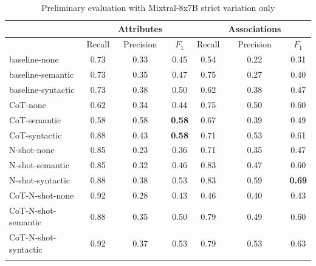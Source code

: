 \begin{table}[!h]
    \scriptsize
    \centering
    \setlength{\tabcolsep}{0.5em}
    \begin{tabular}{lcccccc}
    \toprule
         & & Attributes & & & Associations & \\
     \toprule
         & Recall & Precision & $F_1$ & Recall & Precision & $F_1$ \\
    \toprule
    
    \addlinespace
         baseline-none        & 0.73 & 0.33 & 0.45 & 0.54 & 0.22 & 0.31 \\
    	 baseline-semantic    & 0.73 & 0.35 & 0.47 & 0.75 & 0.27 & 0.40 \\
         baseline-syntactic   & 0.73 & 0.38 & 0.50 & 0.62 & 0.38 & 0.47 \\
         CoT-none             & 0.62 & 0.34 & 0.44 & 0.75 & 0.50 & 0.60 \\
         CoT-semantic         & 0.58 & 0.58 & \textbf{0.58} & 0.67 & 0.39 & 0.49 \\
         CoT-syntactic        & 0.88 & 0.43 & \textbf{0.58} & 0.71 & 0.53 & 0.61 \\
         N-shot-none          & 0.85 & 0.23 & 0.36 & 0.71 & 0.35 & 0.47 \\
         N-shot-semantic      & 0.85 & 0.32 & 0.46 & 0.83 & 0.47 & 0.60 \\
         N-shot-syntactic     & 0.88 & 0.38 & 0.53 & 0.83 & 0.59 & \textbf{0.69} \\
         CoT-N-shot-none      & 0.92 & 0.28 & 0.43 & 0.46 & 0.40 & 0.43 \\
         CoT-N-shot-semantic  & 0.88 & 0.35 & 0.50 & 0.79 & 0.49 & 0.60 \\
         CoT-N-shot-syntactic & 0.92 & 0.37 & 0.53 & 0.79 & 0.53 & 0.63 \\
    \addlinespace
    \bottomrule
    \addlinespace
    \end{tabular}
    \caption{Preliminary evaluation with Mixtral-8x7B strict variation only}
    \label{tab:preliminary-mixtral}
\end{table}



